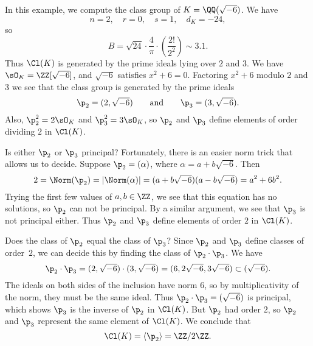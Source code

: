 \begin{example}
	In this example, we compute the class group of $K=\QQ(\sqrt{-6})$.
	We have
	$$
	n = 2, \quad r=0, \quad s=1, \quad d_K = -24,
	$$
	so
	$$
	B = \sqrt{24} \cdot \frac{4}{\pi} \cdot
	\left(\frac{2!}{2^2}\right)\sim 3.1.
	$$
	Thus $\Cl(K)$ is generated by the prime ideals lying over $2$ and $3$.
	We have $\sO_K=\ZZ[\sqrt{-6}]$, and $\sqrt{-6}$ satisfies $x^2+6=0$.
	Factoring $x^2+6$ modulo $2$ and $3$ we see that the class group
	is generated by the prime ideals
	$$
	\p_2 = (2,\sqrt{-6})\qquad\text{and}\qquad
	\p_3 = (3,\sqrt{-6}).
	$$
	Also, $\p_2^2 = 2\sO_K$ and $\p_3^2=3\sO_K$, so
	$\p_2$ and $\p_3$ define elements of order
	dividing $2$ in $\Cl(K)$.
	
	Is either $\p_2$ or $\p_3$ principal?  Fortunately,
	there is an easier norm trick that allows us to decide.
	Suppose $\p_2 = (\alpha)$, where $\alpha=a+b\sqrt{-6}$.
	Then
	$$
	2 = \Norm(\p_2)
	= \left|\Norm(\alpha)\right|
	= (a+b\sqrt{-6})(a-b\sqrt{-6})
	= a^2 + 6b^2.
	$$
	Trying the first few values of $a, b\in \ZZ$, we see that this
	equation has no solutions, so $\p_2$ can not
	be principal.  By a similar argument, we see that $\p_3$
	is not principal either.  Thus $\p_2$ and $\p_3$ define
	elements of order $2$ in $\Cl(K)$.
	
	Does the class of $\p_2$ equal the class of $\p_3$?
	Since $\p_2$ and $\p_3$ define classes of order~$2$,
	we can decide this by finding the class of $\p_2\cdot \p_3$.
	We have
	$$
	\p_2\cdot \p_3
	= (2,\sqrt{-6})\cdot (3,\sqrt{-6})
	= (6,2\sqrt{-6}, 3\sqrt{-6}) \subset (\sqrt{-6}).
	$$
	The ideals on both sides of the inclusion have norm $6$,
	so by multiplicativity of the norm, they must be the
	same ideal.  Thus $\p_2\cdot \p_3=(\sqrt{-6})$ is principal,
	which shows $\p_3$ is the inverse of $\p_2$ in $\Cl(K)$. But
	$\p_2$ had order $2$,
	so $\p_2$ and $\p_3$ represent the same element of $\Cl(K)$.
	We conclude that
	$$
	\Cl(K) = \langle \p_2 \rangle = \ZZ/2\ZZ.
	$$
\end{example}
